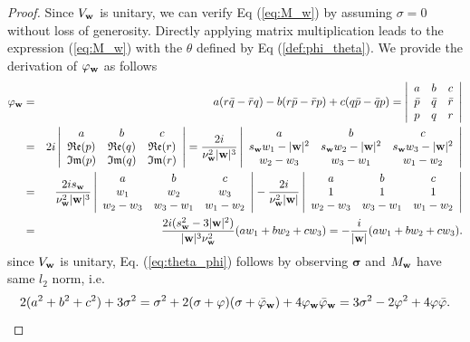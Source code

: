 \documentclass[10pt,a4paper]{amsart}
\newcommand{\bS}{\boldsymbol{\sigma}}
\newcommand{\bw}{{\bf w}}
\renewcommand{\phi}{\varphi}
\begin{document}
\begin{proof}
	Since $V_{\bw}$ is unitary, we can verify Eq (\ref{eq:M_w}) by assuming $\sigma=0$ without loss of generosity. Directly applying matrix multiplication leads to the expression (\ref{eq:M_w}) with the $\theta$ defined by Eq (\ref{def:phi_theta}).  We provide the derivation of $\phi_{\bw}$ as follows
	\begin{eqnarray*}
		\phi_{\bw} &=& a(r\bar q - \bar r q) - b(r\bar p - \bar r p )  +c (q\bar p - \bar q p)= \left|
		\begin{array}{ccc}
			a & b & c\\
			\bar p & \bar q & \bar r \\
			p & q & r \\
		\end{array}
		\right|\\
		&=& 2i \left|
		\begin{array}{ccc}
			a & b & c\\
			\mathfrak{Re}(p) & \mathfrak{Re} (q) & \mathfrak{Re} (r) \\
			\mathfrak{Im}(p) & \mathfrak{Im} (q) & \mathfrak{Im} (r) \\
		\end{array}
		\right|= \frac{2i}{\nu^2_{\bw} |\bw|^3} \left|
		\begin{array}{ccc}
			a & b & c\\
			s_{\bw}w_1-|\bw|^2 & s_{\bw}w_2-|\bw|^2  & s_{\bw}w_3-|\bw|^2 \\
			w_2-w_3 & w_3-w_1 & w_1-w_2 \\
		\end{array}
		\right|\\
		&=&\frac{2i s_{\bw}}{\nu^2_{\bw} |\bw|^3} \left|
		\begin{array}{ccc}
			a & b & c\\
			w_1 & w_2  & w_3 \\
			w_2-w_3 & w_3-w_1 & w_1-w_2 \\
		\end{array}
		\right| - \frac{2i}{\nu^2_{\bw} |\bw|} \left|
		\begin{array}{ccc}
			a & b & c\\
			1 & 1  & 1 \\
			w_2-w_3 & w_3-w_1 & w_1-w_2 \\
		\end{array}
		\right| \\
		&=& \frac{2i (s_{\bw}^2-3|\bw|^2)}{|\bw|^3\nu^2_{\bw}} (aw_1+bw_2+cw_3)= -\frac{i}{|\bw|}(aw_1+bw_2+cw_3).
	\end{eqnarray*}
	since $V_{\bw}$ is unitary,  Eq. (\ref{eq:theta_phi}) follows by observing $\bS$ and $M_{\bw}$ have same $l_2$ norm, i.e.
	\[
	2(a^2+b^2+c^2) + 3\sigma^2 = \sigma^2 + 2(\sigma + \phi) (\sigma + \bar\phi_{\bw} ) + 4\phi_{\bw}\bar\phi_{\bw} = 3\sigma^2 -2\phi^2 +4\phi\bar\phi.
	\]
\end{proof}
\end{document}
